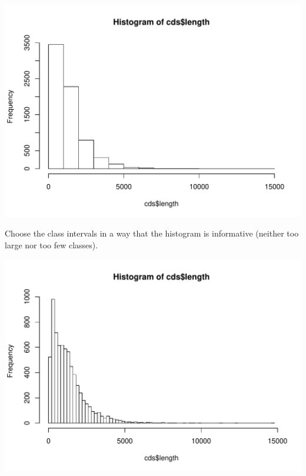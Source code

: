 \documentclass[]{article}
\newenvironment{Shaded}{\begin{snugshade}}{\end{snugshade}}
\newcommand{\KeywordTok}[1]{\textcolor[rgb]{0.94,0.87,0.69}{#1}}
\newcommand{\DataTypeTok}[1]{\textcolor[rgb]{0.87,0.87,0.75}{#1}}
\newcommand{\DecValTok}[1]{\textcolor[rgb]{0.86,0.86,0.80}{#1}}
\newcommand{\StringTok}[1]{\textcolor[rgb]{0.80,0.58,0.58}{#1}}
\newcommand{\OperatorTok}[1]{\textcolor[rgb]{0.94,0.94,0.82}{#1}}
\newcommand{\NormalTok}[1]{\textcolor[rgb]{0.80,0.80,0.80}{#1}}
\begin{document}
\begin{center}\includegraphics{figures/unnamed-chunk-20-1} \end{center}

Choose the class intervals in a way that the histogram is informative
(neither too large nor too few classes).

\begin{Shaded}
\end{Shaded}

\begin{center}\includegraphics{figures/unnamed-chunk-21-1} \end{center}
\end{document}
